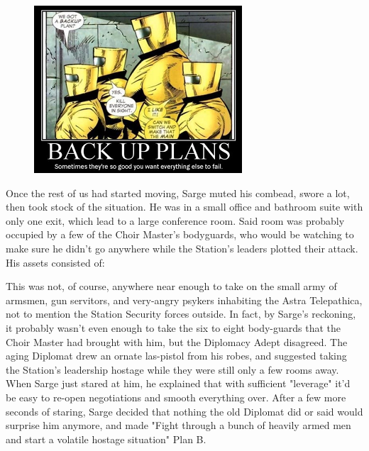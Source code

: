 \begin{figure}
	\begin{center}
		\includegraphics[width=\figwidth]{pics/14/26.png}
	\end{center}
\end{figure}
Once the rest of us had started moving, Sarge muted his combead, swore a lot, then took stock of the situation. 
He was in a small office and bathroom suite with only one exit, which lead to a large conference room. 
Said room was probably occupied by a few of the Choir Master's bodyguards, who would be watching to make sure he didn't go anywhere while the Station's leaders plotted their attack. 
His assets consisted of:










This was not, of course, anywhere near enough to take on the small army of armsmen, gun servitors, and very-angry psykers inhabiting the Astra Telepathica, not to mention the Station Security forces outside. 
In fact, by Sarge's reckoning, it probably wasn't even enough to take the six to eight body-guards that the Choir Master had brought with him, but the Diplomacy Adept disagreed. 
The aging Diplomat drew an ornate las-pistol from his robes, and suggested taking the Station's leadership hostage while they were still only a few rooms away. 
When Sarge just stared at him, he explained that with sufficient "leverage" it'd be easy to re-open negotiations and smooth everything over. 
After a few more seconds of staring, Sarge decided that nothing the old Diplomat did or said would surprise him anymore, and made "Fight through a bunch of heavily armed men and start a volatile hostage situation" Plan B.

